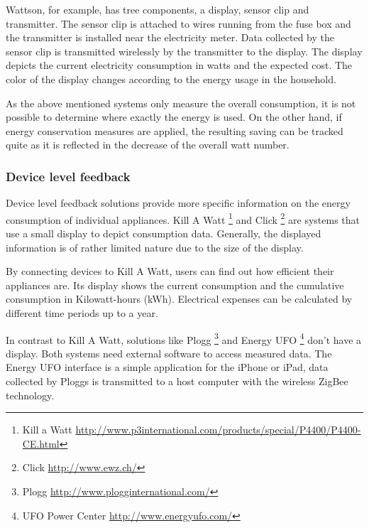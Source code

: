 Wattson, for example, has tree components, a display, sensor clip and transmitter. The sensor clip is attached to wires running from the fuse box and the transmitter is installed near the electricity meter. Data collected by the sensor clip is transmitted wirelessly by the transmitter to the display. The display depicts the current electricity consumption in watts and the expected cost. The color of the display changes according to the energy usage in the household. 

As the above mentioned systems only measure the overall consumption, it is not possible to determine where exactly the energy is used. On the other hand, if energy conservation measures are applied, the resulting saving can be tracked quite as it is reflected in the decrease of the overall watt number.

\subsubsection{Device level feedback}
Device level feedback solutions provide more specific information on the energy consumption of individual appliances. Kill A Watt \footnote{Kill a Watt \url{http://www.p3international.com/products/special/P4400/P4400-CE.html}} and Click \footnote{Click \url{http://www.ewz.ch/}} are systems that use a small display to depict consumption data. Generally, the displayed information is of rather limited nature due to the size of the display.
 
By connecting devices to Kill A Watt, users can find out how efficient their appliances are. Its display shows the current consumption and the cumulative consumption in Kilowatt-hours (kWh). Electrical expenses can be calculated by different time periods up to a year. 

In contrast to Kill A Watt, solutions like Plogg \footnote{Plogg \url{http://www.plogginternational.com/}} and Energy UFO \footnote{UFO Power Center \url{http://www.energyufo.com/}} don't have a display. Both systems need external software to access measured data.
The Energy UFO interface is a simple application for the iPhone or iPad, data collected by Ploggs is transmitted to a host computer with the wireless ZigBee technology.  

